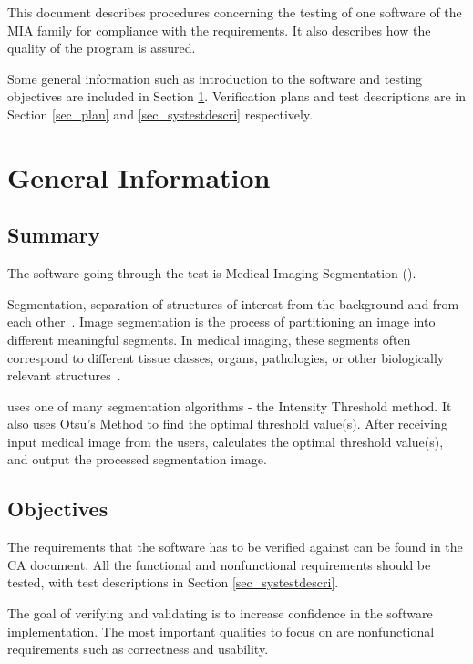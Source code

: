 \documentclass[12pt, titlepage]{article}
\begin{document}
\newpage


This document describes procedures concerning the testing of one software of the
MIA family for compliance with the requirements. It also describes how the
quality of the program is assured.

Some general information such as introduction to the software and testing
objectives are included in Section \ref{sec_geinfo}. Verification plans and test
descriptions are in Section \ref{sec_plan} and \ref{sec_systestdescri}
respectively.

\section{General Information} \label{sec_geinfo}

\subsection{Summary}

The software going through the test is Medical Imaging Segmentation (\progname{}).

Segmentation, separation of structures of interest from the background and from
each other~\cite{Bankman2000}. Image segmentation is the process of partitioning
an image into different meaningful segments. In medical imaging, these segments
often correspond to different tissue classes, organs, pathologies, or other
biologically relevant structures~\cite{Forouzanfar2010}.

\progname{} uses one of many segmentation algorithms - the Intensity Threshold
method. It also uses Otsu's Method to find the optimal threshold value(s). After
receiving input medical image from the users, \progname{} calculates the optimal
threshold value(s), and output the processed segmentation image.

\subsection{Objectives}

The requirements that the software has to be verified against can be found in
the CA document. All the functional and nonfunctional requirements should be
tested, with test descriptions in Section \ref{sec_systestdescri}.

The goal of verifying and validating is to increase confidence in the software
implementation. The most important qualities to focus on are nonfunctional
requirements such as correctness and usability.
\end{document}
